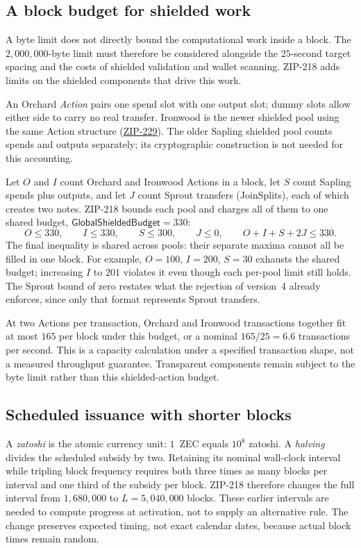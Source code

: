 \documentclass[11pt,a4paper]{article}
\theoremstyle{definition}
\begin{document}
\subsection{A block budget for shielded work}\label{sec:cons-nu7-limits}

A byte limit does not directly bound the computational work inside a
block. The $2{,}000{,}000$-byte limit must therefore be considered alongside
the $25$-second target spacing and the costs of shielded validation and
wallet scanning. ZIP-218
adds limits on the shielded components that drive this work.

An Orchard \emph{Action} pairs one spend slot with one output slot; dummy
slots allow either side to carry no real transfer. Ironwood is the newer
shielded pool using the same Action structure
(\href{https://zips.z.cash/zip-0229}{ZIP-229}). The older Sapling shielded
pool counts spends and outputs separately; its cryptographic construction is
not needed for this accounting.

Let $O$ and $I$ count Orchard and Ironwood Actions in a block, let $S$
count Sapling spends plus outputs, and let $J$ count Sprout transfers
(JoinSplits), each of which creates two notes. ZIP-218 bounds each pool and
charges all of them to one shared budget,
$\mathsf{GlobalShieldedBudget}=330$:
\[
 O\leq330,\qquad I\leq330,\qquad S\leq300,\qquad J\leq0,
 \qquad O+I+S+2J\leq330.
\]
The final inequality is shared across pools: their separate maxima cannot
all be filled in one block. For example, $O=100$, $I=200$, $S=30$ exhausts
the shared budget; increasing $I$ to $201$ violates it even though each
per-pool limit still holds. The Sprout bound of zero restates what the
rejection of version~4 already enforces, since only that format represents
Sprout transfers.

At two Actions per transaction, Orchard and Ironwood transactions together
fit at most $165$ per block under this budget, or a nominal
$165/25=6.6$ transactions per second. This is a
capacity calculation under a specified transaction shape, not a measured
throughput guarantee. Transparent components remain subject to the byte
limit rather than this shielded-action budget.

\subsection{Scheduled issuance with shorter blocks}
\label{sec:cons-nu7-subsidy}

A \emph{zatoshi} is the atomic currency unit: $1$~ZEC equals $10^8$
zatoshi. A \emph{halving} divides the scheduled subsidy by two. Retaining its
nominal wall-clock interval while tripling block frequency requires both
three times as many blocks per interval and one third of the subsidy per
block. ZIP-218 therefore changes the full interval from $1{,}680{,}000$
to $L=5{,}040{,}000$ blocks. These earlier intervals are needed to compute
progress at activation, not to supply an alternative rule. The change
preserves expected timing, not exact calendar dates, because actual block
times remain random.
\end{document}
